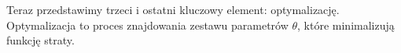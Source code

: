 Teraz przedstawimy trzeci i ostatni kluczowy element: optymalizację. Optymalizacja to proces znajdowania zestawu parametrów $\theta$, które minimalizują funkcję straty.





